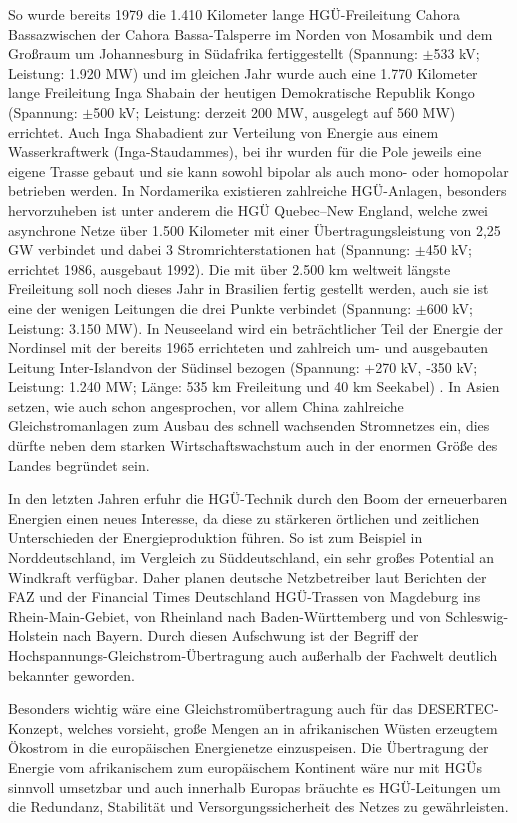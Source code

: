 So wurde bereits 1979 die 1.410 Kilometer lange HGÜ-Freileitung \q Cahora Bassa\qe zwischen der Cahora Bassa-Talsperre im Norden von Mosambik und dem Großraum um Johannesburg in Südafrika fertiggestellt (Spannung: $\pm$533 kV; Leistung: 1.920 MW)
und im gleichen Jahr wurde auch eine 1.770 Kilometer lange Freileitung \q Inga Shaba\qe in der heutigen Demokratische Republik Kongo (Spannung: $\pm$500 kV; Leistung: derzeit 200 MW, ausgelegt auf 560 MW) errichtet\cite{Schymroch}.
Auch \q Inga Shaba\qe dient zur Verteilung von Energie aus einem Wasserkraftwerk (Inga-Staudammes),
bei ihr wurden für die Pole jeweils eine eigene Trasse gebaut und sie kann sowohl bipolar als auch mono- oder homopolar betrieben werden\cite{Schymroch}.
In Nordamerika existieren zahlreiche HGÜ-Anlagen, besonders hervorzuheben ist unter anderem die HGÜ Quebec–New England, welche zwei asynchrone Netze über 1.500 Kilometer mit einer Übertragungsleistung von 2,25 GW verbindet und dabei 3 Stromrichterstationen hat (Spannung: $\pm$450 kV; errichtet 1986, ausgebaut 1992)\cite{Liste}.
Die mit über 2.500 km weltweit längste Freileitung soll noch dieses Jahr in Brasilien fertig gestellt werden, auch sie ist eine der wenigen Leitungen die drei Punkte verbindet (Spannung: $\pm$600 kV; Leistung: 3.150 MW). %
In Neuseeland wird ein beträchtlicher Teil der Energie der Nordinsel mit der bereits 1965 errichteten und zahlreich um- und ausgebauten Leitung \q Inter-Island\qe von der Südinsel bezogen (Spannung: +270 kV, -350 kV; Leistung: 1.240 MW; Länge: 535 km Freileitung und 40 km Seekabel) \cite{Schymroch}\cite{Liste}.
In Asien setzen, wie auch schon angesprochen, vor allem China zahlreiche Gleichstromanlagen zum Ausbau des schnell wachsenden Stromnetzes ein, dies dürfte neben dem starken Wirtschaftswachstum auch in der enormen Größe des Landes begründet sein.

In den letzten Jahren erfuhr die HGÜ-Technik durch den Boom der erneuerbaren Energien einen neues Interesse, da diese zu stärkeren örtlichen und zeitlichen Unterschieden der Energieproduktion führen.
So ist zum Beispiel in Norddeutschland, im Vergleich zu Süddeutschland, ein sehr großes Potential an Windkraft verfügbar. Daher planen deutsche Netzbetreiber laut Berichten der FAZ und der Financial Times Deutschland HGÜ-Trassen von Magdeburg ins Rhein-Main-Gebiet, von Rheinland nach Baden-Württemberg und von Schleswig-Holstein nach Bayern.\cite{FAZ1}\cite{FAZ2}\cite{FinancialTimes}
Durch diesen Aufschwung ist der Begriff der Hochspannungs-Gleichstrom-Übertragung auch außerhalb der Fachwelt deutlich bekannter geworden.

Besonders wichtig wäre eine Gleichstromübertragung auch für das DESERTEC-Konzept, welches vorsieht, große Mengen an in afrikanischen Wüsten erzeugtem Ökostrom in die europäischen Energienetze einzuspeisen. Die Übertragung der Energie vom afrikanischem zum europäischem Kontinent wäre nur mit HGÜs sinnvoll umsetzbar und auch innerhalb Europas bräuchte es HGÜ-Leitungen um die Redundanz, Stabilität und Versorgungssicherheit des Netzes zu gewährleisten.\cite{TRANS-CSP}

